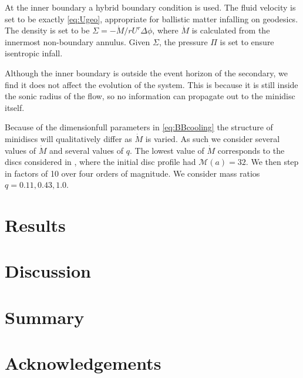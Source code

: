\documentclass{emulateapj}
\newcommand{\De}{\Delta}
\newcommand{\Sig}{\Sigma}
\begin{document}
At the inner boundary a hybrid boundary condition is used.  The fluid velocity is set to be exactly \eqref{eq:Ugeo}, appropriate for ballistic matter infalling on geodesics.  The density is set to be $\Sig = -\dot{M} / r U^r \De \phi$, where $\dot{M}$ is calculated from the innermost non-boundary annulus.  Given $\Sig$, the pressure $\Pi$ is set to ensure isentropic infall.

Although the inner boundary is outside the event horizon of the secondary, we find it does not affect the evolution of the system.  This is because it is still inside the sonic radius of the flow, so no information can propagate out to the minidisc itself.  

Because of the dimensionfull parameters in \eqref{eq:BBcooling} the structure of minidiscs will qualitatively differ as $\dot{M}$ is varied.  As such we consider several values of $\dot{M}$ and several values of $q$.  The lowest value of $\dot{M}$ corresponds to the discs considered in \cite{Farris14}, where the initial disc profile had $\mathcal{M}(a) = 32$.  We then step in factors of 10 over four orders of magnitude.  We consider mass ratios $q = 0.11, 0.43, 1.0$.


\section{Results}
\label{sec:results}




\section{Discussion}
\label{sec:discussion}




\section{Summary}
\label{sec:summary}





\section{Acknowledgements}


\newpage





%
\end{document}

